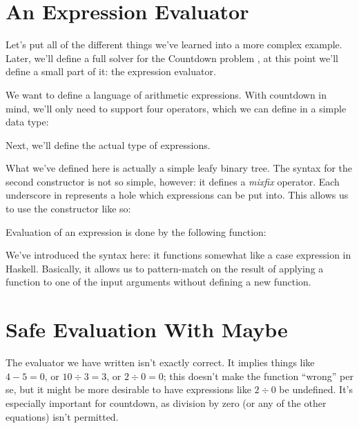 \section{An Expression Evaluator}
Let's put all of the different things we've learned into a more complex example.
Later, we'll define a full solver for the Countdown problem
\cite{huttonCountdownProblem2002} , at this
point we'll define a small part of it: the expression evaluator.

We want to define a language of arithmetic expressions.
With countdown in mind, we'll only need to support four operators, which we can
define in a simple data type:
\begin{agdalisting}
\end{agdalisting}
Next, we'll define the actual type of expressions.
\begin{agdalisting}
\end{agdalisting}
What we've defined here is actually a simple leafy binary tree.
The syntax for the second constructor is not so simple, however: it defines a
\emph{mixfix} operator.
Each underscore in \AgdaInductiveConstructor{\(\_\langle \_ \rangle\_\)}
represents a hole which expressions can be put into.
This allows us to use the constructor like so:
\begin{agdalisting*}
\end{agdalisting*}

Evaluation of an expression is done by the following function:
\begin{agdalisting}
\end{agdalisting}
We've introduced the  syntax here: it functions somewhat like
a case expression in Haskell.
Basically, it allows us to pattern-match on the result of applying a function to
one of the input arguments without defining a new function.
\section{Safe Evaluation With Maybe}
The evaluator we have written isn't exactly correct.
It implies things like \(4 - 5 = 0\), or \(10 \div 3 = 3\), or \(2 \div 0 = 0\);
this doesn't make the function ``wrong'' per se, but it might be more desirable
to have expressions like \(2 \div 0\) be undefined.
It's especially important for countdown, as division by zero (or any of the
other equations) isn't permitted.


